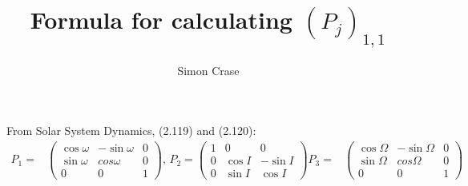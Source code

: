 \documentclass[]{article}
\title{Formula for calculating $(P_j)_{1,1}$}
\author{Simon Crase}
\begin{document}
\maketitle

\begin{abstract}
	
\end{abstract}

\section{}

From Solar System Dynamics, (2.119) and (2.120):
\begin{align*}
P_1 =& \begin{pmatrix}
\cos \omega & - \sin \omega & 0\\
\sin \omega & cos \omega & 0\\
0 & 0  & 1
\end{pmatrix}
\text{, }
P_2 = \begin{pmatrix}
1 & 0 & 0\\
0 & \cos I & - \sin I\\
0 & \sin I & \cos I
\end{pmatrix}
P_3 =& \begin{pmatrix}
\cos \Omega & - \sin \Omega & 0\\
\sin \Omega & cos \Omega & 0\\
0 & 0  & 1
\end{pmatrix}
\end{align*}
\end{document}

